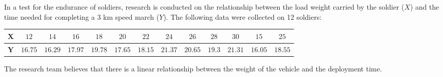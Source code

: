 \begin{enquestion}{18}{
    In a test for the endurance of soldiers, research is conducted on the relationship between the load weight carried by the soldier ($X$) and the time needed for completing a 3 km speed march ($Y$).
    The following data were collected on 12 soldiers:

    \begin{center}
        \begin{tabular}{c|cccccccccccc}
            \toprule
                $\mathbf{X}$ & $12$ & $14$ & $16$ & $18$ & $20$ & $22$ & $24$ & $26$ & $28$ & $30$ & $15$ & $25$ \\
            \midrule
                $\mathbf{Y}$ & $16.75$ & $16.29$ & $17.97$ & $19.78$ & $17.65$ & $18.15$ & $21.37$ & $20.65$ & $19.3$ & $21.31$ & $16.05$ & $18.55$ \\
            \bottomrule
        \end{tabular}
    \end{center}

    The research team believes that there is a linear relationship between the weight of the vehicle and the deployment time.
}
    


\end{enquestion}

